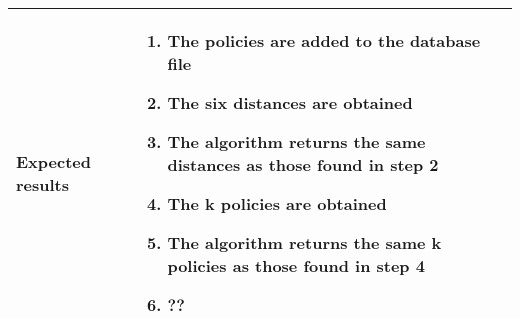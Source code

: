 \begin{center}
\begin{longtable}{ | p{4cm} | p{10cm} | }
			Expected results &	\begin{enumerate}
							\item The policies are added to the database file
							\item The six distances are obtained
							\item The algorithm returns the same distances as those found in step 2
							\item The k policies are obtained
							\item The algorithm returns the same k policies as those found in step 4
							\item ??
						\end{enumerate} \\  [3pt] \hline
	\end{longtable}
\end{center}

